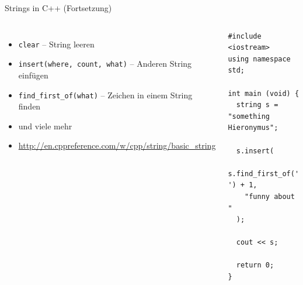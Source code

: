 \begin{frame}[fragile]{Strings in C++ (Fortsetzung)}
%
\begin{columns}[T]
\begin{itemize}
\item \texttt{clear} -- String leeren
\item \texttt{insert(where, count, what)} -- Anderen String einfügen
\item \texttt{find\_first\_of(what)} -- Zeichen in einem String finden
\item und viele mehr
\item[\Thus] \url{http://en.cppreference.com/w/cpp/string/basic_string}
\end{itemize}
%
\vspace{-12pt}
\begin{codebox}
\begin{verbatim}
#include <iostream>
using namespace std;

int main (void) {
  string s = "something Hieronymus";
  
  s.insert(
    s.find_first_of(' ') + 1,
    "funny about "
  );
  
  cout << s;
  
  return 0;
}
\end{verbatim}
\end{codebox}
\end{columns}
%
\end{frame}


